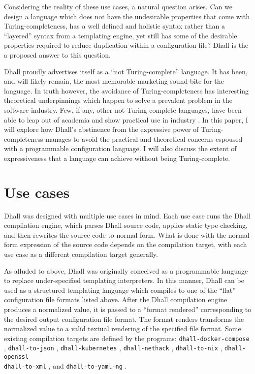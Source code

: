 \documentclass[12pt]{diazessay}
\begin{document}
Considering the reality of these use cases, a natural question arises.
Can we design a language which does not have the undesirable properties that come with Turing-completeness, has a well defined and holistic syntax rather than a ``layered'' syntax from a templating engine, yet still has some of the desirable properties required to reduce duplication within a configuration file? Dhall is the a proposed answer to this question.

Dhall proudly advertises itself as a ``not Turing-complete'' language.
It has been, and will likely remain, the most memorable marketing sound-bite for the language.
In truth however, the avoidance of Turing-completeness has interesting theoretical underpinnings which happen to solve a prevalent problem in the software industry.
Few, if any, other not Turing-complete languages, have been able to leap out of academia and show practical use in industry \cite{CoFu92,hammond2003hume, mcbride2004epigram}.
In this paper, I will explore how Dhall's abstinence from the expressive power of Turing-completeness manages to avoid the practical and theoretical concerns espoused with a programmable configuration language.
I will also discuss the extent of expressiveness that a language can achieve without being Turing-complete.

\section*{Use cases}

Dhall was designed with multiple use cases in mind.
Each use case runs the Dhall compilation engine, which parses Dhall source code, applies static type checking, and then rewrites the source code to normal form.
What is done with the normal form expression of the source code depends on the compilation target, with each use case as a different compilation target generally.

As alluded to above, Dhall was originally conceived as a programmable language to replace under-specified templating interpreters.
In this manner, Dhall can be used as a structured templating language which compiles to one of the ``flat'' configuration file formats listed above.
After the Dhall compilation engine produces a normalized value, it is passed to a ``format rendered'' corresponding to the desired output configuration file format.
The format renders transforms the normalized value to a valid textual rendering of the specified file format.
Some existing compilation targets are defined by the programs: \texttt{dhall-docker-compose} \cite{DhallDocker}, \texttt{dhall-to-json} \cite{DhallJSON}, \texttt{dhall-kubernetes} \cite{DhallKubernetes}, \texttt{dhall-nethack} \cite{DhallNethack}, \texttt{dhall-to-nix} \cite{DhallNix}, \texttt{dhall-openssl} \cite{DhallOpenSSL} \\ \texttt{dhall-to-xml} \cite{DhallXML}, and \texttt{dhall-to-yaml-ng} \cite{DhallYAML}.
\end{document}
